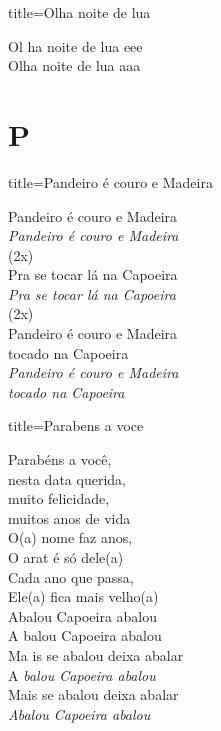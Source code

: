 \documentclass[fontsize=14pt, paper=a4, twoside, DIV=20]{scrreprt} %
\newcommand\chapTOC[1]{
    \chapter*{#1}
    \addcontentsline{toc}{chapter}{#1}
    \markboth{#1}{#1}}
\begin{document}
\begin{multicols*}{2}
\begin{song}{title={Olha noite de lua}}
        \begin{verse*}
            Ol ha noite de lua eee\\
            Olha noite de lua aaa\\
        \end{verse*}
\end{song}

\chapTOC{P}

\begin{song}{title={Pandeiro é couro e Madeira}}
        \begin{verse*}
             Pandeiro é couro e Madeira  \\
            \textit{ Pandeiro é couro e Madeira} \\
            (2x)\\
            Pra se tocar lá na Capoeira\\
            \textit{Pra se tocar lá na Capoeira}\\
            (2x)\\
            Pandeiro é couro e Madeira \\
            tocado na Capoeira \\
            \textit{Pandeiro é couro e Madeira \\ tocado na Capoeira} \\
        \end{verse*}
\end{song}

\begin{song}{title={Parabens a voce}}
        \begin{verse*}
            Parabéns a você,\\
            nesta data querida,\\
            muito felicidade,\\
            muitos anos de vida\\
            O(a) nome faz anos,\\
            O arat é só dele(a)\\
            Cada ano que passa,\\
            Ele(a) fica mais velho(a)\\
            Abalou Capoeira abalou\\
            A balou Capoeira abalou\\
            Ma is se abalou deixa abalar\\
            A \textit{balou Capoeira abalou}\\
            Mais se abalou deixa abalar\\
            \textit{Abalou Capoeira abalou}\\
        \end{verse*}
\end{song}


\end{multicols*}
\end{document}
